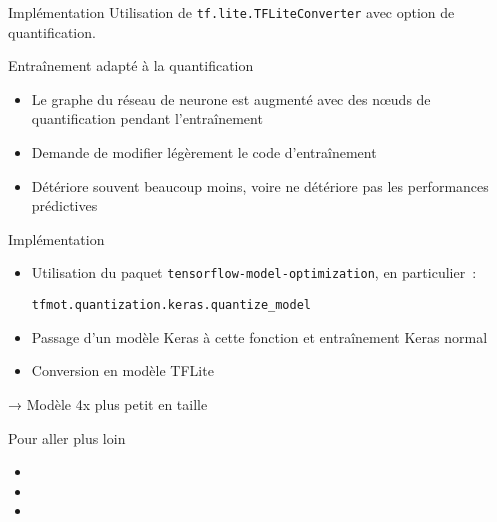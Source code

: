 \begin{frame}{Implémentation}
  Utilisation de \texttt{tf.lite.TFLiteConverter} avec option de quantification.
\end{frame}

\begin{frame}{Entraînement adapté à la quantification}
  \begin{itemize}
    \item Le graphe du réseau de neurone est augmenté avec des nœuds de quantification pendant l'entraînement
    \item Demande de modifier légèrement le code d'entraînement
    \item Détériore souvent beaucoup moins, voire ne détériore pas les performances prédictives
  \end{itemize}
\end{frame}

\begin{frame}{Implémentation}
  \begin{itemize}
    \item Utilisation du paquet \texttt{tensorflow-model-optimization}, en particulier~:

    \texttt{tfmot.quantization.keras.quantize\_model}
    \item Passage d'un modèle Keras à cette fonction et entraînement Keras normal
    \item Conversion en modèle TFLite
  \end{itemize}
  → Modèle 4x plus petit en taille
\end{frame}

\begin{frame}{Pour aller plus loin}
  \begin{itemize}
    \item {}
    \item {}
    \item {}
  \end{itemize}
\end{frame}